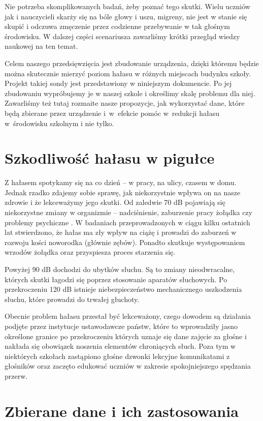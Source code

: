\documentclass[12pt, a4paper]{article}
\begin{document}
Nie potrzeba skomplikowanych badań, żeby poznać tego skutki. Wielu uczniów jak i nauczycieli skarży się na bóle głowy i uszu, migreny, nie jest w stanie się skupić i odczuwa zmęczenie przez codzienne przebywanie w tak głośnym środowisku. W dalszej części scenariusza zawarliśmy krótki przegląd wiedzy naukowej na ten temat.

Celem naszego przedsięwzięcia jest zbudowanie urządzenia, dzięki któremu będzie można skutecznie mierzyć poziom hałasu w różnych miejscach budynku szkoły. Projekt takiej sondy jest przedstawiony w niniejszym dokumencie. Po jej zbudowaniu wypróbujemy je w naszej szkole i określimy skalę problemu dla niej. Zawarliśmy też tutaj rozmaite nasze propozycje, jak wykorzystać dane, które będą zbierane przez urządzenie i~w~efekcie pomóc w~redukcji hałasu w~środowisku szkolnym i nie tylko.

\section{Szkodliwość hałasu w pigułce}
Z hałasem spotykamy się na co dzień -- w pracy, na ulicy, czasem w domu. Jednak rzadko zdajemy sobie sprawę, jak niekorzystnie wpływa on na nasze zdrowie i że lekceważymy jego skutki. Od zaledwie 70 dB pojawiają się niekorzystne zmiany w organizmie -- nadciśnienie, zaburzenie pracy żołądka czy problemy psychiczne\cite{70db} . W badaniach przeprowadzonych w ciągu kilku ostatnich lat stwierdzono, że hałas ma zły wpływ na ciążę i prowadzi do zaburzeń w rozwoju kości noworodka (głównie zębów). Ponadto skutkuje występowaniem wrzodów żołądka oraz przyspiesza proces starzenia się.

Powyżej 90 dB dochodzi do ubytków słuchu. Są to zmiany nieodwracalne, których skutki łagodzi się poprzez stosowanie aparatów słuchowych. Po przekroczeniu 120 dB istnieje niebezpieczeństwo mechanicznego uszkodzenia słuchu, które prowadzi do trwałej głuchoty.

Obecnie problem hałasu przestał być lekceważony, czego dowodem są działania podjęte przez instytucje ustawodawcze państw, które to wprowadziły jasno określone granice po przekroczeniu których uznaje się dane zajęcie za głośne i nakłada się obowiązek noszenia elementów chroniących słuch. Poza tym w niektórych szkołach zastąpiono głośne dzwonki lekcyjne komunikatami z głośników oraz zaczęto edukować uczniów w zakresie spokojniejszego spędzania przerw.

\section{Zbierane dane i ich zastosowania}
\end{document}
